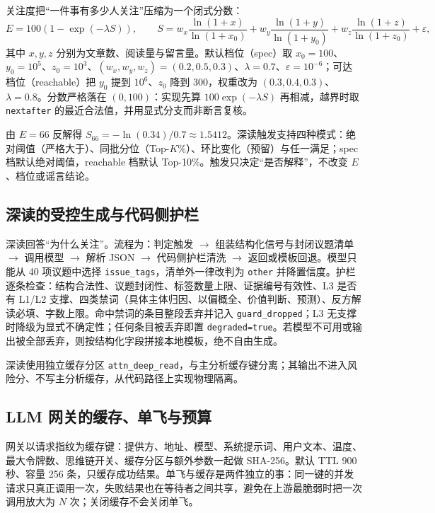 \documentclass[12pt,a4paper,fontset=windows]{ctexart}
\begin{document}
关注度把“一件事有多少人关注”压缩为一个闭式分数：
\begin{equation}
E = 100\left(1-\exp(-\lambda S)\right),\qquad
S = w_x\frac{\ln(1+x)}{\ln(1+x_0)} + w_y\frac{\ln(1+y)}{\ln(1+y_0)} + w_z\frac{\ln(1+z)}{\ln(1+z_0)} + \varepsilon,
\end{equation}
其中 $x,y,z$ 分别为文章数、阅读量与留言量。默认档位（spec）取 $x_0=100$、$y_0=10^5$、$z_0=10^3$、$(w_x,w_y,w_z)=(0.2,0.5,0.3)$、$\lambda=0.7$、$\varepsilon=10^{-6}$；可达档位（reachable）把 $y_0$ 提到 $10^6$、$z_0$ 降到 300，权重改为 $(0.3,0.4,0.3)$、$\lambda=0.8$。分数严格落在 $(0,100)$：实现先算 $100\exp(-\lambda S)$ 再相减，越界时取 \texttt{nextafter} 的最近合法值，并用显式分支而非断言复核。

由 $E=66$ 反解得 $S_{66}=-\ln(0.34)/0.7\approx 1.5412$。深读触发支持四种模式：绝对阈值（严格大于）、同批分位（Top-$K\%$）、环比变化（预留）与任一满足；spec 档默认绝对阈值，reachable 档默认 Top-10\%。触发只决定“是否解释”，不改变 $E$、档位或谣言结论。

\subsection{深读的受控生成与代码侧护栏}

深读回答“为什么关注”。流程为：判定触发 $\rightarrow$ 组装结构化信号与封闭议题清单 $\rightarrow$ 调用模型 $\rightarrow$ 解析 JSON $\rightarrow$ 代码侧护栏清洗 $\rightarrow$ 返回或模板回退。模型只能从 40 项议题中选择 \texttt{issue\_tags}，清单外一律改判为 \texttt{other} 并降置信度。护栏逐条检查：结构合法性、议题封闭性、标签数量上限、证据编号有效性、L3 是否有 L1/L2 支撑、四类禁词（具体主体归因、以偏概全、价值判断、预测）、反方解读必填、字数上限。命中禁词的条目整段丢弃并记入 \texttt{guard\_dropped}；L3 无支撑时降级为显式不确定性；任何条目被丢弃即置 \texttt{degraded=true}。若模型不可用或输出被全部丢弃，则按结构化字段拼接本地模板，绝不自由生成。

深读使用独立缓存分区 \texttt{attn\_deep\_read}，与主分析缓存键分离；其输出不进入风险分、不写主分析缓存，从代码路径上实现物理隔离。

\subsection{LLM 网关的缓存、单飞与预算}

网关以请求指纹为缓存键：提供方、地址、模型、系统提示词、用户文本、温度、最大令牌数、思维链开关、缓存分区与额外参数一起做 SHA-256。默认 TTL 900 秒、容量 256 条，只缓存成功结果。单飞与缓存是两件独立的事：同一键的并发请求只真正调用一次，失败结果也在等待者之间共享，避免在上游最脆弱时把一次调用放大为 $N$ 次；关闭缓存不会关闭单飞。
\end{document}
